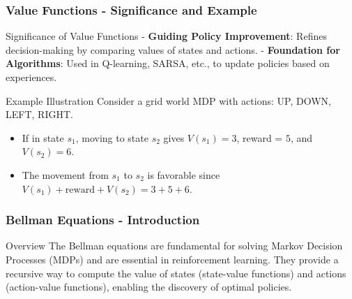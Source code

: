 \documentclass[aspectratio=169]{beamer}
\begin{document}
\begin{frame}[fragile]
    \frametitle{Value Functions - Significance and Example}
    \begin{block}{Significance of Value Functions}
        - \textbf{Guiding Policy Improvement}: Refines decision-making by comparing values of states and actions.
        - \textbf{Foundation for Algorithms}: Used in Q-learning, SARSA, etc., to update policies based on experiences.
    \end{block}

    \begin{block}{Example Illustration}
        Consider a grid world MDP with actions: UP, DOWN, LEFT, RIGHT.
        \begin{itemize}
            \item If in state $s_1$, moving to state $s_2$ gives $V(s_1) = 3$, reward = $5$, and $V(s_2) = 6$.
            \item The movement from $s_1$ to $s_2$ is favorable since $V(s_1) + \text{reward} + V(s_2) = 3 + 5 + 6$.
        \end{itemize}
    \end{block}
\end{frame}

\begin{frame}[fragile]
    \frametitle{Bellman Equations - Introduction}
    \begin{block}{Overview}
        The Bellman equations are fundamental for solving Markov Decision Processes (MDPs) and are essential in reinforcement learning. 
        They provide a recursive way to compute the value of states (state-value functions) and actions (action-value functions), enabling the discovery of optimal policies.
    \end{block}
\end{frame}
\end{document}
